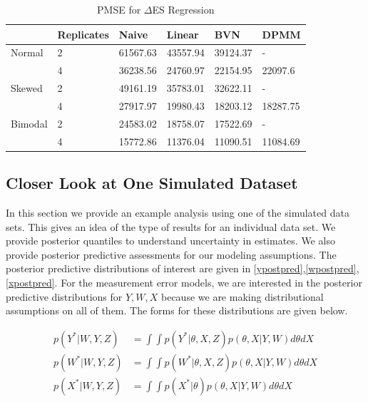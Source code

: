 \documentclass[11pt]{article}\usepackage[]{graphicx}\usepackage[]{color}
\begin{document}
\begin{table}[ht]
\centering
\begin{tabular}{ll|llll}
  \hline
 & Replicates & Naive & Linear & BVN & DPMM \\ 
  \hline
Normal & 2 & 61567.63 & 43557.94 & 39124.37 & - \\ 
   & 4 & 36238.56 & 24760.97 & 22154.95 & 22097.6 \\ 
  Skewed & 2 & 49161.19 & 35783.01 & 32622.11 & - \\ 
   & 4 & 27917.97 & 19980.43 & 18203.12 & 18287.75 \\ 
  Bimodal & 2 & 24583.02 & 18758.07 & 17522.69 & - \\ 
   & 4 & 15772.86 & 11376.04 & 11090.51 & 11084.69 \\ 
   \hline
\end{tabular}
\caption{PMSE for $\Delta$ES Regression} 
\label{pmsees}
\end{table}


\subsection{Closer Look at One Simulated Dataset}
 
In this section we provide an example analysis using one of the simulated data sets. This gives an idea of the type of results for an individual data set. We provide posterior quantiles to understand uncertainty in estimates. We also provide posterior predictive assessments for our modeling assumptions.  The posterior predictive distributions of interest are given in \eqref{ypostpred},\eqref{wpostpred},\eqref{xpostpred}. For the measurement error models, we are interested in the posterior predictive distributions for $Y,W,X$ because we are making distributional assumptions on all of them. The forms for these distributions are given below.
  
\begin{align}
  \label{ypostpred}
  p(Y^*|W,Y,Z) &= \int \int p(Y^*|\theta,X,Z) p(\theta, X|Y,W) d\theta dX \\
  \label{wpostpred}
  p(W^*|W,Y,Z) &= \int \int p(W^*|\theta,X,Z) p(\theta, X|Y,W) d\theta dX \\
  \label{xpostpred}
  p(X^*|W,Y,Z) &= \int \int p(X^*|\theta) p(\theta, X|Y,W) d\theta dX
\end{align}
\end{document}
